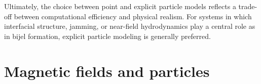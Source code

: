 Ultimately, the choice between point and explicit particle models reflects a trade-off between computational efficiency and physical realism. For systems in which interfacial structure, 
jamming, or near-field hydrodynamics play a central role as in bijel formation, explicit particle modeling is generally preferred.

\section{Magnetic fields and particles}










